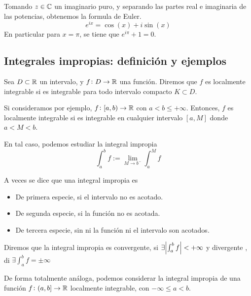 \begin{prop*}
	Tomando $z \in \mathbb{C}$ un imaginario puro, y separando las partes real e imaginaria
	de las potencias, obtenemos la formula de Euler.
	\[
		e^{ix} = \cos(x) + i\sin(x)
	\]
	En particular para $x = \pi$, se tiene que $e^{i\pi} + 1 = 0$.
\end{prop*}



\subsection{Integrales impropias: definición y ejemplos}

\begin{defi}
	Sea $D \subset \mathbb{R}$ un intervalo, y $f \colon D \to \mathbb{R}$ una función.
	Diremos que $f$ es localmente integrable si es integrable para todo intervalo
	compacto $K \subset D$.
\end{defi}
\begin{obs}
	Si consideramos por ejemplo, $f \colon [a,b) \to \mathbb{R}$ con $a < b \leq +\infty$.
	Entonces, $f$ es localmente integrable si es integrable en cualquier intervalo
	$[a,M]$ donde $a < M < b$.

	En tal caso, podemos estudiar la integral impropia
	\[
		\int^b_a f := \lim_{M \to b^-} \int^M_a f
	\]
\end{obs}

\begin{obs*}
	A veces se dice que una integral impropia es
	\begin{itemize}
		\item De primera especie, si el intervalo no es acotado.
		\item De segunda especie, si la función no es acotada.
		\item De tercera especie, sin ni la función ni el intervalo son acotados.
	\end{itemize}
\end{obs*}

\begin{defi}
	Diremos que la integral impropia es convergente, si $\exists\abs{\int^b_a f}
	<+\infty$ y divergente , di $\exists\int^b_a f = \pm\infty$
\end{defi}

\begin{obs}
	De forma totalmente análoga, podemos considerar la integral impropia de una
	función $f \colon (a,b] \to \mathbb{R}$ localmente integrable, con $-\infty \leq a
	< b$.
\end{obs}

